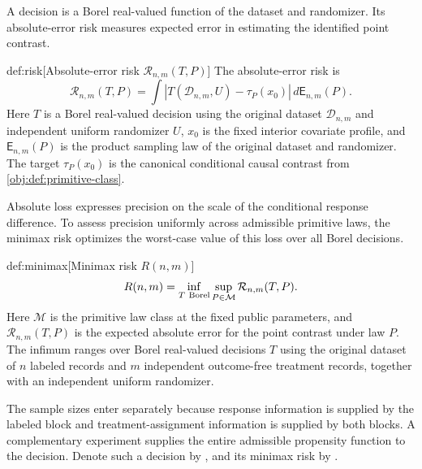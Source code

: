 A decision  is a Borel real-valued function of the dataset and randomizer. Its absolute-error risk  measures expected error in estimating the identified point contrast.

\begin{definitionv}{def:risk}[Absolute-error risk $\mathcal R_{n,m}(T,P)$]
The absolute-error risk is
\[
\mathcal R_{n,m}(T,P)
=
\int
\left|T(\mathcal D_{n,m},U)-\tau_P(x_0)\right|
\,d\mathsf E_{n,m}(P).
\]
Here \(T\) is a Borel real-valued decision using the original dataset \(\mathcal D_{n,m}\) and independent uniform randomizer \(U\), \(x_0\) is the fixed interior covariate profile, and \(\mathsf E_{n,m}(P)\) is the product sampling law of the original dataset and randomizer. The target \(\tau_P(x_0)\) is the canonical conditional causal contrast from \cref{obj:def:primitive-class}.
\end{definitionv}

Absolute loss expresses precision on the scale of the conditional response difference. To assess precision uniformly across admissible primitive laws, the minimax risk  optimizes the worst-case value of this loss over all Borel decisions.

\begin{definitionv}{def:minimax}[Minimax risk \(R(n,m)\)]
\[
R(n,m)=\inf_{T\ {\rm Borel}}\sup_{P\in\mathcal M}\mathcal R_{n,m}(T,P).
\]
Here \(\mathcal M\) is the primitive law class at the fixed public parameters, and \(\mathcal R_{n,m}(T,P)\) is the expected absolute error for the point contrast under law \(P\). The infimum ranges over Borel real-valued decisions \(T\) using the original dataset of \(n\) labeled records and \(m\) independent outcome-free treatment records, together with an independent uniform randomizer.
\end{definitionv}

The sample sizes enter separately because response information is supplied by the labeled block and treatment-assignment information is supplied by both blocks. A complementary experiment supplies the entire admissible propensity function to the decision. Denote such a decision by , and its minimax risk by .

